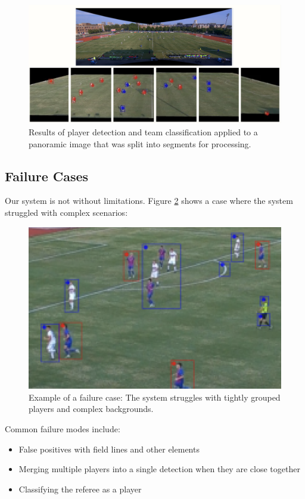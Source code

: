 \documentclass[10pt,twocolumn,letterpaper]{article}
\begin{document}
\begin{figure}[t]
  \centering
  \includegraphics[width=\linewidth]{../edge_detection_steps/results_3.png}
  \caption{Results of player detection and team classification applied to a panoramic image that was split into segments for processing.}
  \label{fig:panoramic_results}
\end{figure}

\subsection{Failure Cases}

Our system is not without limitations. Figure \ref{fig:failure_case} shows a case where the system struggled with complex scenarios:

\begin{figure}[t]
  \centering
  \includegraphics[width=0.9\linewidth]{../edge_detection_steps/results_fail.jpeg}
  \caption{Example of a failure case: The system struggles with tightly grouped players and complex backgrounds.}
  \label{fig:failure_case}
\end{figure}

Common failure modes include:
\begin{itemize}
    \item False positives with field lines and other elements
    \item Merging multiple players into a single detection when they are close together
    \item Classifying the referee as a player
\end{itemize}
\end{document}

